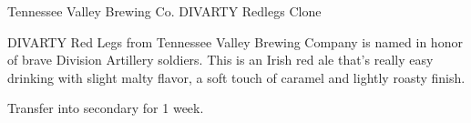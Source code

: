 \begin{recipie}{Tennessee Valley Brewing Co. DIVARTY Redlegs Clone}

\begin{aboutblock}
DIVARTY Red Legs from Tennessee Valley Brewing Company is named in honor of brave
Division Artillery soldiers. This is an Irish red ale that's really easy drinking
with slight malty flavor, a soft touch of caramel and lightly roasty finish.
\sourceaha
\end{aboutblock}


\begin{methodandtiming}
 
\begin{mashsteps}
\end{mashsteps}

\begin{fermentationsteps}
\end{fermentationsteps}

\begin{directions}
Transfer into secondary for 1 week.
\end{directions}

\end{methodandtiming}

\pagebreak

\begin{ingredientsblock}

\begin{malts}
\end{malts}

\begin{hops}
\end{hops}


\end{ingredientsblock}

\end{recipie}
